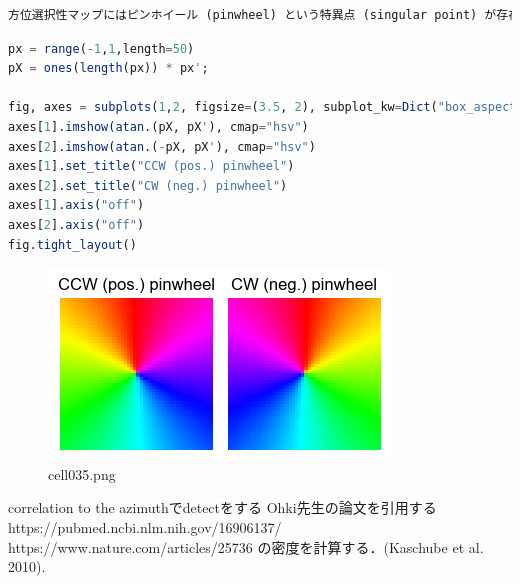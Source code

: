\begin{lstlisting}[language=julia]
方位選択性マップにはピンホイール (pinwheel) という特異点 (singular point) が存在する．
\end{lstlisting}
\begin{lstlisting}[language=julia]
px = range(-1,1,length=50)
pX = ones(length(px)) * px';

fig, axes = subplots(1,2, figsize=(3.5, 2), subplot_kw=Dict("box_aspect"=>1))
axes[1].imshow(atan.(pX, pX'), cmap="hsv")
axes[2].imshow(atan.(-pX, pX'), cmap="hsv")
axes[1].set_title("CCW (pos.) pinwheel")
axes[2].set_title("CW (neg.) pinwheel")
axes[1].axis("off")
axes[2].axis("off")
fig.tight_layout()
\end{lstlisting}
\begin{figure}[ht]
	\centering
	\includegraphics[scale=0.8, max width=\linewidth]{./fig/local-learning-rule/self-organizing-map/cell035.png}
	\caption{cell035.png}
	\label{cell035.png}
\end{figure}
correlation to the azimuthでdetectをする
Ohki先生の論文を引用する
https://pubmed.ncbi.nlm.nih.gov/16906137/
https://www.nature.com/articles/25736
の密度を計算する．(Kaschube et al. 2010).
\begin{lstlisting}[language=julia]

\end{lstlisting}
